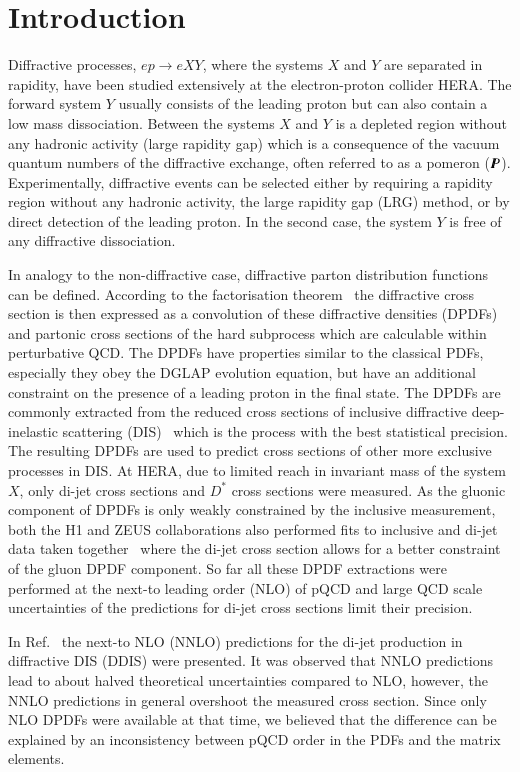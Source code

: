 \documentclass[12pt]{article}
\begin{document}
\section{Introduction}
%
Diffractive processes, $ep \to  eXY$, where the systems $X$ and $Y$ are separated in rapidity, have been studied extensively at the electron-proton collider HERA.
The forward system $Y$ usually consists of the leading proton but can also contain a low mass dissociation.
Between the systems $X$ and $Y$ is a depleted region without any hadronic activity (large rapidity gap) which is a consequence of the vacuum quantum numbers of the diffractive exchange, often referred to as a pomeron ($I\!\!P$).
Experimentally, diffractive events can be selected either by requiring a rapidity region without any hadronic activity, the large rapidity gap (LRG) method, or by direct detection of the leading proton.
In the second case, the system $Y$ is free of any diffractive dissociation.

In analogy to the non-diffractive case, diffractive parton distribution functions can be defined.
According to the factorisation theorem~\cite{Collins:1997sr} the diffractive cross section is then expressed as a convolution of these diffractive densities (DPDFs) and partonic cross sections of the hard subprocess which are calculable within perturbative QCD.
The DPDFs have properties similar to the classical PDFs, especially they obey the DGLAP evolution equation, but have an additional constraint on the presence of a leading proton in the final state.
The DPDFs are commonly extracted from the reduced cross sections of inclusive diffractive deep-inelastic scattering (DIS)~\cite{Aktas:2006hy} which is the process with the best statistical precision.
The resulting DPDFs are used to predict cross sections of other more exclusive processes in DIS.
At HERA, due to limited reach in invariant mass of the system $X$, only di-jet cross sections and $D^{*}$ cross sections were measured.
As the gluonic component of DPDFs is only weakly constrained by the inclusive measurement, both the H1 and ZEUS collaborations also performed fits to inclusive and di-jet data taken together~\cite{Aktas:2007bv,Chekanov:2009aa} where the di-jet cross section allows for a better constraint of the gluon DPDF component.
So far all these DPDF extractions were performed at the next-to leading order (NLO)  of pQCD and large QCD scale uncertainties of the predictions for di-jet cross sections limit their precision.

In Ref.~\cite{Britzger:2018zvv} the next-to NLO (NNLO) predictions for the di-jet production in diffractive DIS (DDIS) were presented.
It was observed that NNLO predictions lead to about halved theoretical uncertainties compared to NLO, however, the NNLO predictions in general overshoot the measured cross section.
Since only NLO DPDFs were available at that time, we believed that the difference can be explained by an inconsistency between pQCD order in the PDFs and the matrix elements.
\end{document}
